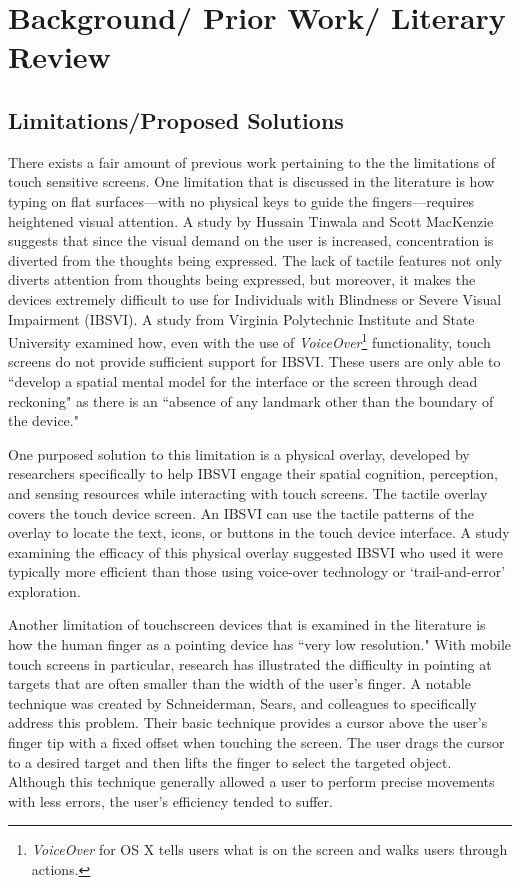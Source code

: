 \documentclass{article}
\begin{document}
\section{Background/ Prior Work/ Literary Review}
\subsection{Limitations/Proposed Solutions}
There exists a fair amount of previous work pertaining to the the limitations of touch sensitive screens. One limitation that is discussed in the literature is how typing on flat surfaces---with no physical keys to guide the fingers---requires heightened visual attention. A study by Hussain Tinwala and Scott MacKenzie suggests that since the visual demand on the user is increased, concentration is diverted from the thoughts being expressed. \cite{Tinwala:2010:ETE:1868914.1868972} The lack of tactile features not only diverts attention from thoughts being expressed, but moreover, it makes the devices extremely difficult to use for Individuals with Blindness or Severe Visual Impairment (IBSVI). A study from Virginia Polytechnic Institute and State University examined how, even with the use of \textit{VoiceOver}\footnote{\textit{VoiceOver} for OS X tells users what is on the screen and walks users through actions.\cite{VoiceOver}} functionality, touch screens do not provide sufficient support for IBSVI. These users are only able to ``develop a spatial mental model for the interface or the screen through dead reckoning" as there is an ``absence of any landmark other than the boundary of the device." \cite{El-Glaly:2013:TTF:2460625.2460665} 

One purposed solution to this limitation is a physical overlay, developed by researchers specifically to help IBSVI engage their spatial cognition, perception, and sensing resources while interacting with touch screens.  \cite{El-Glaly:2013:TTF:2460625.2460665} The tactile overlay covers the touch device screen. An IBSVI can use the tactile patterns of the overlay to locate the text, icons, or buttons in the touch device interface. A study examining the efficacy of this physical overlay suggested IBSVI who used it were typically more efficient than those using voice-over technology or `trail-and-error' exploration. \cite{El-Glaly:2013:TTF:2460625.2460665}


Another limitation of touchscreen devices that is examined in the literature is how the human finger as a pointing device has ``very low resolution."\cite{Albinsson} With mobile touch screens in particular, research has illustrated the difficulty in pointing at targets that are often smaller than the width of the user's finger. A notable technique was created by Schneiderman, Sears, and colleagues to specifically address this problem.\cite{Sears} Their basic technique provides a cursor above the user's finger tip with a fixed offset when touching the screen. The user drags the cursor to a desired target and then lifts the finger to select the targeted object. Although this technique generally allowed a user to perform precise movements with less errors, the user's efficiency tended to suffer.\cite{Sears}
\end{document}
